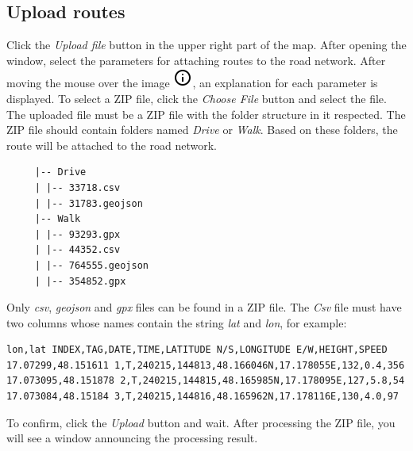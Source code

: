 \subsection{Upload routes}
Click the \textit{Upload file} button in the upper right part of the map. After opening the window, select the parameters for attaching routes to the road network. After moving the mouse over the image \includegraphics[scale=0.5]{img/icons/info.png}, an explanation for each parameter is displayed. To select a ZIP file, click the \textit{Choose File} button and select the file. The uploaded file must be a ZIP file with the folder structure in it respected. The ZIP file should contain folders named \textit{Drive} or \textit{Walk}. Based on these folders, the route will be attached to the road network.
\begin{verbatim}
     |-- Drive
     | |-- 33718.csv
     | |-- 31783.geojson
     |-- Walk
     | |-- 93293.gpx
     | |-- 44352.csv
     | |-- 764555.geojson
     | |-- 354852.gpx
\end{verbatim}
Only \textit{csv}, \textit{geojson} and \textit{gpx} files can be found in a ZIP file.
The \textit{Csv} file must have two columns whose names contain the string \textit{lat} and \textit{lon}, for example:
\begin{verbatim}
lon,lat INDEX,TAG,DATE,TIME,LATITUDE N/S,LONGITUDE E/W,HEIGHT,SPEED
17.07299,48.151611 1,T,240215,144813,48.166046N,17.178055E,132,0.4,356
17.073095,48.151878 2,T,240215,144815,48.165985N,17.178095E,127,5.8,54
17.073084,48.15184 3,T,240215,144816,48.165962N,17.178116E,130,4.0,97
\end{verbatim}
To confirm, click the \textit{Upload} button and wait. After processing the ZIP file, you will see a window announcing the processing result.
